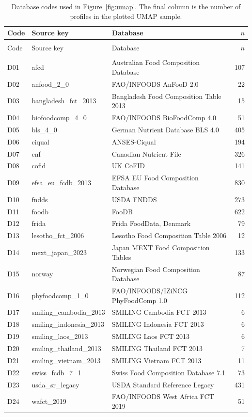 \documentclass[11pt]{article}
\begin{document}
\begin{longtable}{@{}>{\raggedright\arraybackslash}p{}>{\raggedright\arraybackslash}p{}>{\raggedright\arraybackslash}p{}r@{}}
\caption{Database codes used in Figure~\ref{fig:umap}. The final column is the number of profiles in the plotted UMAP sample.}\label{tab:db}\\
\toprule
Code & Source key & Database & $n$ \\
\midrule
\endfirsthead
\multicolumn{4}{c}{\tablename\ \thetable\ (continued)}\\
\toprule
Code & Source key & Database & $n$ \\
\midrule
\endhead
\midrule
\multicolumn{4}{r}{Continued on next page}\\
\endfoot
\bottomrule
\endlastfoot
D01 & afcd & Australian Food Composition Database & 107 \\
D02 & anfood\_2\_0 & FAO/INFOODS AnFooD 2.0 & 22 \\
D03 & bangladesh\_fct\_2013 & Bangladesh Food Composition Table 2013 & 15 \\
D04 & biofoodcomp\_4\_0 & FAO/INFOODS BioFoodComp 4.0 & 51 \\
D05 & bls\_4\_0 & German Nutrient Database BLS 4.0 & 405 \\
D06 & ciqual & ANSES-Ciqual & 194 \\
D07 & cnf & Canadian Nutrient File & 326 \\
D08 & cofid & UK CoFID & 141 \\
D09 & efsa\_eu\_fcdb\_2013 & EFSA EU Food Composition Database & 830 \\
D10 & fndds & USDA FNDDS & 273 \\
D11 & foodb & FooDB & 622 \\
D12 & frida & Frida FoodData, Denmark & 79 \\
D13 & lesotho\_fct\_2006 & Lesotho Food Composition Table 2006 & 12 \\
D14 & mext\_japan\_2023 & Japan MEXT Food Composition Tables & 133 \\
D15 & norway & Norwegian Food Composition Database & 87 \\
D16 & phyfoodcomp\_1\_0 & FAO/INFOODS/IZiNCG PhyFoodComp 1.0 & 112 \\
D17 & smiling\_cambodia\_2013 & SMILING Cambodia FCT 2013 & 6 \\
D18 & smiling\_indonesia\_2013 & SMILING Indonesia FCT 2013 & 6 \\
D19 & smiling\_laos\_2013 & SMILING Laos FCT 2013 & 6 \\
D20 & smiling\_thailand\_2013 & SMILING Thailand FCT 2013 & 7 \\
D21 & smiling\_vietnam\_2013 & SMILING Vietnam FCT 2013 & 11 \\
D22 & swiss\_fcdb\_7\_1 & Swiss Food Composition Database 7.1 & 73 \\
D23 & usda\_sr\_legacy & USDA Standard Reference Legacy & 431 \\
D24 & wafct\_2019 & FAO/INFOODS West Africa FCT 2019 & 51 \\
\end{longtable}
\end{document}
